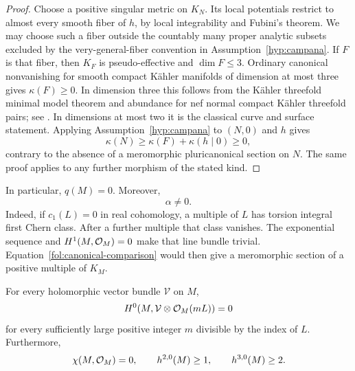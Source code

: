 \begin{proof}
Choose a positive singular metric on $K_N$.  Its local potentials restrict
to almost every smooth fiber of $h$, by local integrability and Fubini's
theorem.  We may choose such a fiber outside the countably many proper
analytic subsets excluded by the very-general-fiber convention in
Assumption~\ref{hyp:campana}.  If $F$ is that fiber, then $K_F$ is
pseudo-effective and $\dim F\leq3$.  Ordinary canonical nonvanishing for
smooth compact K\"ahler manifolds of dimension at most three gives
$\kappa(F)\geq0$.  In dimension three this follows from the K\"ahler
threefold minimal model theorem and abundance for nef normal compact
K\"ahler threefold pairs; see
\cite{HPMinimalModels,DasOuAbundanceII}.  In dimensions at most two it is
the classical curve and surface statement.  Applying
Assumption~\ref{hyp:campana} to $(N,0)$ and $h$ gives
\[
 \kappa(N)\geq\kappa(F)+\kappa(h\mid0)\geq0,
\]
contrary to the absence of a meromorphic pluricanonical section on $N$.
The same proof applies to any further morphism of the stated kind.
\end{proof}

In particular, $q(M)=0$.  Moreover,
\begin{equation}\label{fol:nonzero-alpha}
 \alpha\ne0.
\end{equation}
Indeed, if $c_1(L)=0$ in real cohomology, a multiple of $L$ has torsion
integral first Chern class.  After a further multiple that class vanishes.
The exponential sequence and $H^1(M,\mathcal{O}_M)=0$ make that line bundle
trivial.  Equation~\eqref{fol:canonical-comparison} would then give a
meromorphic section of a positive multiple of $K_M$.

\begin{lemma}\label{fol:eventual-vanishing}
For every holomorphic vector bundle $\mathcal V$ on $M$,
\[
 H^0(M,\mathcal V\otimes\mathcal{O}_M(mL))=0
\]
for every sufficiently large positive integer $m$ divisible by the index
of $L$.  Furthermore,
\begin{equation}\label{fol:forms-dimensions}
 \chi(M,\mathcal{O}_M)=0,\qquad h^{2,0}(M)\geq1,\qquad h^{3,0}(M)\geq2.
\end{equation}
\end{lemma}

